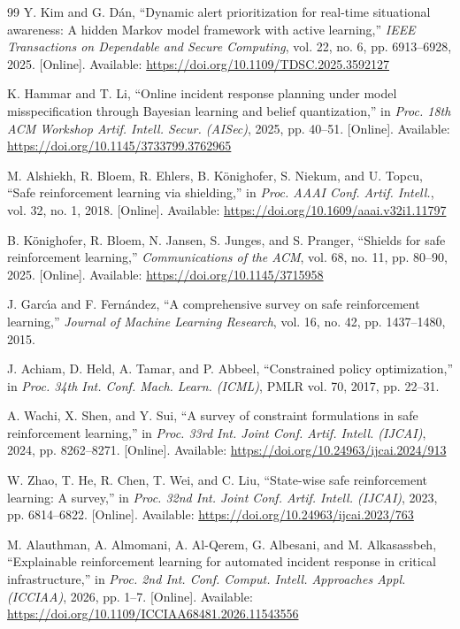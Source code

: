 \documentclass[12pt,a4paper]{article}
\begin{document}
\begin{thebibliography}{99}
 Y. Kim and G. D\'{a}n, ``Dynamic alert prioritization for real-time situational awareness: A hidden Markov model framework with active learning,'' \emph{IEEE Transactions on Dependable and Secure Computing}, vol. 22, no. 6, pp. 6913--6928, 2025. [Online]. Available: \url{https://doi.org/10.1109/TDSC.2025.3592127}

 K. Hammar and T. Li, ``Online incident response planning under model misspecification through Bayesian learning and belief quantization,'' in \emph{Proc. 18th ACM Workshop Artif. Intell. Secur. (AISec)}, 2025, pp. 40--51. [Online]. Available: \url{https://doi.org/10.1145/3733799.3762965}

 M. Alshiekh, R. Bloem, R. Ehlers, B. K\"{o}nighofer, S. Niekum, and U. Topcu, ``Safe reinforcement learning via shielding,'' in \emph{Proc. AAAI Conf. Artif. Intell.}, vol. 32, no. 1, 2018. [Online]. Available: \url{https://doi.org/10.1609/aaai.v32i1.11797}

 B. K\"{o}nighofer, R. Bloem, N. Jansen, S. Junges, and S. Pranger, ``Shields for safe reinforcement learning,'' \emph{Communications of the ACM}, vol. 68, no. 11, pp. 80--90, 2025. [Online]. Available: \url{https://doi.org/10.1145/3715958}

 J. Garc\'{\i}a and F. Fern\'{a}ndez, ``A comprehensive survey on safe reinforcement learning,'' \emph{Journal of Machine Learning Research}, vol. 16, no. 42, pp. 1437--1480, 2015.

 J. Achiam, D. Held, A. Tamar, and P. Abbeel, ``Constrained policy optimization,'' in \emph{Proc. 34th Int. Conf. Mach. Learn. (ICML)}, PMLR vol. 70, 2017, pp. 22--31.

 A. Wachi, X. Shen, and Y. Sui, ``A survey of constraint formulations in safe reinforcement learning,'' in \emph{Proc. 33rd Int. Joint Conf. Artif. Intell. (IJCAI)}, 2024, pp. 8262--8271. [Online]. Available: \url{https://doi.org/10.24963/ijcai.2024/913}

 W. Zhao, T. He, R. Chen, T. Wei, and C. Liu, ``State-wise safe reinforcement learning: A survey,'' in \emph{Proc. 32nd Int. Joint Conf. Artif. Intell. (IJCAI)}, 2023, pp. 6814--6822. [Online]. Available: \url{https://doi.org/10.24963/ijcai.2023/763}

 M. Alauthman, A. Almomani, A. Al-Qerem, G. Albesani, and M. Alkasassbeh, ``Explainable reinforcement learning for automated incident response in critical infrastructure,'' in \emph{Proc. 2nd Int. Conf. Comput. Intell. Approaches Appl. (ICCIAA)}, 2026, pp. 1--7. [Online]. Available: \url{https://doi.org/10.1109/ICCIAA68481.2026.11543556}


\end{thebibliography}
\end{document}
